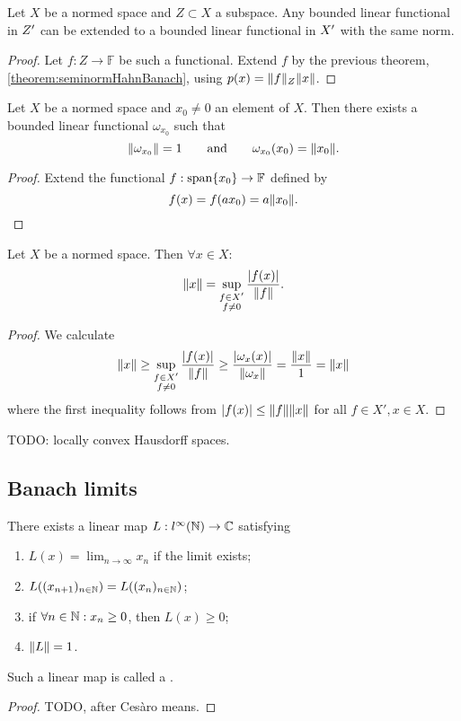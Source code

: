 \begin{corollary}
Let $X$ be a normed space and $Z\subset X$ a subspace. Any bounded linear functional in ${Z}^\prime$ can be extended to a bounded linear functional in ${X}^\prime$ with the same norm.
\end{corollary}
\begin{proof}
Let $f:Z\to \mathbb{F}$ be such a functional. Extend $f$ by the previous theorem, \ref{theorem:seminormHahnBanach}, using $p(x) = \lVert f\rVert_Z\lVert x\rVert$.
\end{proof}
\begin{corollary} \label{corollary:existenceBoundedFunctionalOfSameNorm}
Let $X$ be a normed space and $x_0\neq 0$ an element of $X$. Then there exists a bounded linear functional $\omega_{x_0}$ such that
\[ \lVert\omega_{x_0}\rVert = 1 \qquad \text{and} \qquad \omega_{x_0}(x_0)=\lVert x_0\rVert. \]
\end{corollary}
\begin{proof}
Extend the functional $f: \operatorname{span}\{x_0\}\to \mathbb{F}$ defined by
\[ f(x) = f(ax_0) = a\lVert x_0\rVert. \]
\end{proof}
\begin{corollary}
Let $X$ be a normed space. Then $\forall x\in X:$
\[ \lVert x\rVert = \sup_{\substack{f\in X' \\ f\neq 0}}\frac{|f(x)|}{\lVert f\rVert}. \]
\end{corollary}
\begin{proof}
We calculate
\[ \lVert x\rVert \geq \sup_{\substack{f\in X' \\ f\neq 0}}\frac{|f(x)|}{\lVert f\rVert} \geq \frac{|\omega_{x}(x)|}{\lVert\omega_{x}\rVert} = \frac{\lVert x\rVert}{1} = \lVert x\rVert \]
where the first inequality follows from $|f(x)|\leq \lVert f\rVert\lVert x\rVert$ for all $f\in X', x\in X$.
\end{proof}

TODO: locally convex Hausdorff spaces.

\subsection{Banach limits}
\begin{proposition}
There exists a linear map $L:l^\infty(\mathbb{N}) \to \mathbb{C}$ satisfying
\begin{enumerate}
\item $\displaystyle L(x) = \lim_{n\to \infty}x_n$ if the limit exists;
\item $L((x_{n+1})_{n\in\mathbb{N}}) = L((x_n)_{n\in\mathbb{N}})$;
\item if $\forall n\in\mathbb{N}:x_n\geq 0$, then $L(x) \geq 0$;
\item $\lVert L\rVert = 1$.
\end{enumerate}
Such a linear map is called a .
\end{proposition}
\begin{proof}
TODO, after Cesàro means.
\end{proof}

